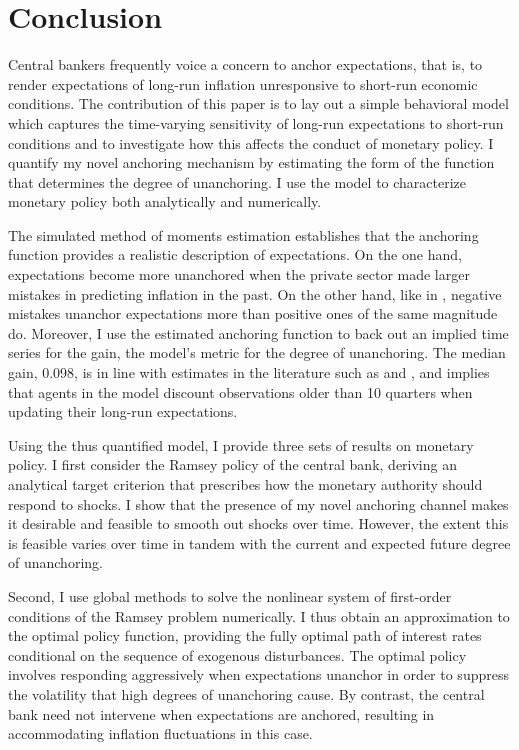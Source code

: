\documentclass[11pt]{article}
\renewcommand{\[}{\begin{equation}}
\renewcommand{\]}{\end{equation}}
\begin{document}
\section{Conclusion}\label{conclusion}
Central bankers frequently voice a concern to anchor expectations, that is, to render expectations of long-run inflation unresponsive to short-run economic conditions. The contribution of this paper is to lay out a simple behavioral model which captures the time-varying sensitivity of long-run expectations to short-run conditions and to investigate how this affects the conduct of monetary policy. I quantify my novel anchoring mechanism by estimating the form of the function that determines the degree of unanchoring. I use the model to characterize monetary policy both analytically and numerically. 

The simulated method of moments estimation establishes that the anchoring function provides a realistic description of expectations. On the one hand, expectations become more unanchored when the private sector made larger mistakes in predicting inflation in the past. On the other hand, like in  \cite{hebden2020robust}, negative mistakes unanchor expectations more than positive ones of the same magnitude do. Moreover, I use the estimated anchoring function to back out an implied time series for the gain, the model's metric for the degree of unanchoring. The median gain, 0.098, is in line with estimates in the literature such as \cite{milani2014learning} and \cite{carvalho2019anchored}, and implies that agents in the model discount observations older than 10 quarters when updating their long-run expectations. 

Using the thus quantified model, I provide three sets of results on monetary policy. I first consider the Ramsey policy of the central bank, deriving an analytical target criterion that prescribes how the monetary authority should respond to shocks. I show that the presence of my novel anchoring channel makes it desirable and feasible to smooth out shocks over time. However, the extent this is feasible varies over time in tandem with the current and expected future degree of unanchoring.

Second, I use global methods to solve the nonlinear system of first-order conditions of the Ramsey problem numerically. I thus obtain an approximation to the optimal policy function, providing the fully optimal path of interest rates conditional on the sequence of exogenous disturbances. The optimal policy involves responding aggressively when expectations unanchor in order to suppress the volatility that high degrees of unanchoring cause. By contrast, the central bank need not intervene when expectations are anchored, resulting in accommodating inflation fluctuations in this case. 
\end{document}

